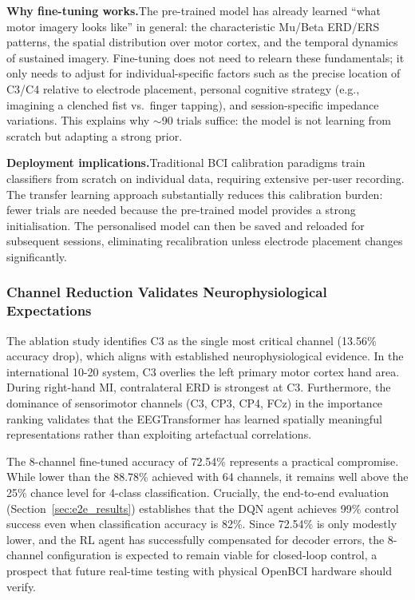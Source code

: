 \documentclass[12pt, a4paper]{article}
\begin{document}
\textbf{Why fine-tuning works.}\quad The pre-trained model has already learned ``what motor imagery looks like'' in general: the characteristic Mu/Beta ERD/ERS patterns, the spatial distribution over motor cortex, and the temporal dynamics of sustained imagery. Fine-tuning does not need to relearn these fundamentals; it only needs to adjust for individual-specific factors such as the precise location of C3/C4 relative to electrode placement, personal cognitive strategy (e.g., imagining a clenched fist vs.\ finger tapping), and session-specific impedance variations. This explains why $\sim$90 trials suffice: the model is not learning from scratch but adapting a strong prior.

\textbf{Deployment implications.}\quad Traditional BCI calibration paradigms train classifiers from scratch on individual data, requiring extensive per-user recording. The transfer learning approach substantially reduces this calibration burden: fewer trials are needed because the pre-trained model provides a strong initialisation. The personalised model can then be saved and reloaded for subsequent sessions, eliminating recalibration unless electrode placement changes significantly.

\subsubsection{Channel Reduction Validates Neurophysiological Expectations}

The ablation study identifies C3 as the single most critical channel (13.56\% accuracy drop), which aligns with established neurophysiological evidence. In the international 10-20 system, C3 overlies the left primary motor cortex hand area. During right-hand MI, contralateral ERD is strongest at C3. Furthermore, the dominance of sensorimotor channels (C3, CP3, CP4, FCz) in the importance ranking validates that the EEGTransformer has learned spatially meaningful representations rather than exploiting artefactual correlations.

The 8-channel fine-tuned accuracy of 72.54\% represents a practical compromise. While lower than the 88.78\% achieved with 64 channels, it remains well above the 25\% chance level for 4-class classification. Crucially, the end-to-end evaluation (Section~\ref{sec:e2e_results}) establishes that the DQN agent achieves 99\% control success even when classification accuracy is 82\%. Since 72.54\% is only modestly lower, and the RL agent has successfully compensated for decoder errors, the 8-channel configuration is expected to remain viable for closed-loop control, a prospect that future real-time testing with physical OpenBCI hardware should verify.
\end{document}
